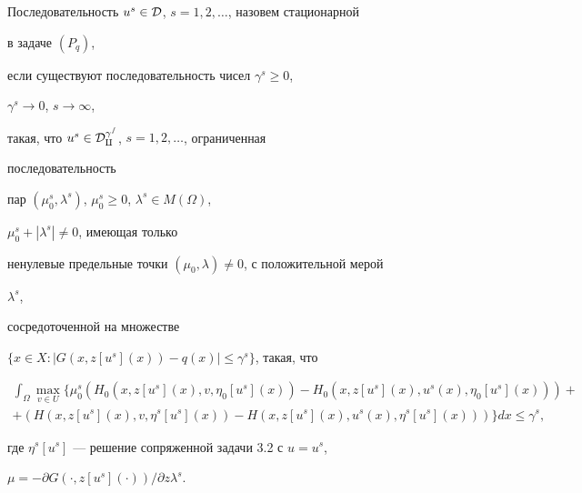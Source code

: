 \begin{defns} 


Последовательность $u^s\in\cal D$, $s=1,2,\dotsc$, назовем стационарной 


в задаче $(P_q)$, 


если существуют последовательность чисел $\gamma^s\ge0$, 


$\gamma^s\to0$, $s\to\infty$, 


такая, что $u^s\in\cal D^{\gamma^s}_q$, $s=1,2,\dotsc$, ограниченная 


последовательность 


пар $(\mu^s_0,\lambda^s)$, $\mu^s_0\ge0$, $\lambda^s\in M(\Omega)$, 


$\mu^s_0+|\lambda^s|\ne0$, имеющая только 


ненулевые предельные точки $(\mu_0,\lambda)\ne0$, с положительной мерой 


$\lambda^s$, 


сосредоточенной на множестве 


$\{x\in X:|G(x,z[u^s](x))-q(x)|\le\gamma^s\}$, такая, что 


\begin{multline*} 


\int_\Omega\max_{v\in U}\{\mu^{s}_0(H_0 


(x,z[u^{s}](x),v,\eta_0[u^{s}](x))- 


H_0(x,z[u^{s}](x),u^{s}(x),\eta_0 


[u^{s}](x)))+ \\ 


% 


+(H(x,z[u^{s}](x),v, 


\eta^s[u^{s}](x))- 


H(x,z[u^{s}](x),u^{s}(x),\eta^s 


[u^{s}](x)))\}dx\le\gamma^s, 


\end{multline*} 


где $\eta^s[u^s]$ --- решение сопряженной задачи 3.2 с $u=u^s$, 


$\mu=-\partial G(\cdot,z[u^s](\cdot))/\partial z\lambda^s$. 


\end{defns} 


 


